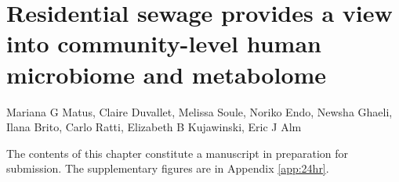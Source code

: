 
\graphicspath{{24hr/figures/}}

\chapter{Residential sewage provides a view into community-level human microbiome and metabolome}\label{chap:24hr}

\noindent
Mariana G Matus, Claire Duvallet, Melissa Soule, Noriko Endo, Newsha Ghaeli,  Ilana Brito, Carlo Ratti, Elizabeth B Kujawinski, Eric J Alm

\bigskip
\bigskip
\noindent
The contents of this chapter constitute a manuscript in preparation for submission. The supplementary figures are in Appendix \ref{app:24hr}.

\clearpage


